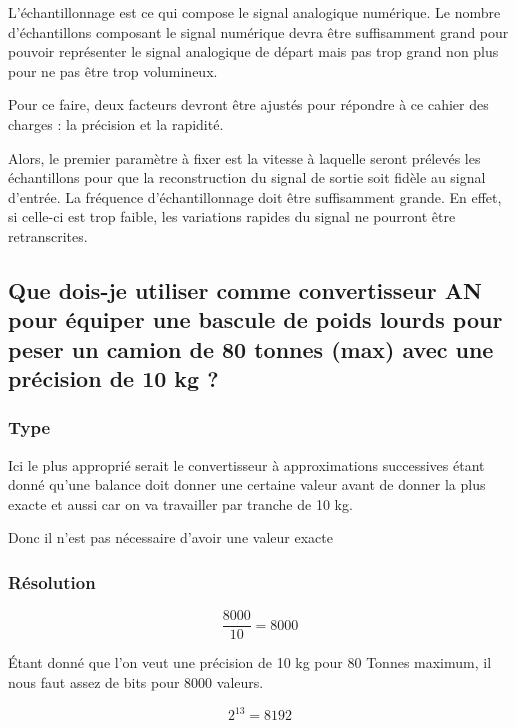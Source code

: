 \documentclass[a4paper]{article}
\begin{document}
L’échantillonnage est ce qui compose le signal analogique numérique. Le nombre d'échantillons composant le signal numérique devra être suffisamment grand pour pouvoir représenter le signal analogique de départ mais pas trop grand non plus pour ne pas être trop volumineux.

Pour ce faire, deux facteurs devront être ajustés pour répondre à ce cahier des charges : la précision et la rapidité.

Alors, le premier paramètre à fixer est la vitesse à laquelle seront prélevés les échantillons pour que la reconstruction du signal de sortie soit fidèle au signal d'entrée. La fréquence d'échantillonnage doit être suffisamment grande. En effet, si celle-ci est trop faible, les variations rapides du signal ne pourront être retranscrites.










\subsection{Que dois-je utiliser comme convertisseur AN pour équiper une bascule de poids lourds pour peser un camion de 80 tonnes (max) avec une précision de 10 kg ?}





\subsubsection{Type}

Ici le plus approprié serait le convertisseur à approximations successives étant donné qu'une balance doit donner une certaine valeur avant de donner la plus exacte et aussi car on va travailler par tranche de 10 kg.

Donc il n'est pas nécessaire d'avoir une valeur exacte 





\subsubsection{Résolution}  

$$ \frac{8000}{10} = 8000 $$

Étant donné que l'on veut une précision de 10 kg pour 80 Tonnes maximum, il nous faut assez de bits pour 8000 valeurs. 

$$ 2^{13} = 8192 $$
\end{document}
